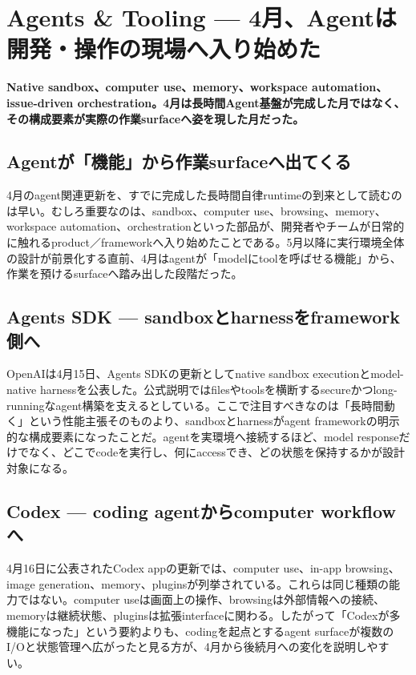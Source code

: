\section{Agents \& Tooling — 4月、Agentは開発・操作の現場へ入り始めた}
\label{pkg:agents-tooling-april}
\noindent\textbf{Native sandbox、computer use、memory、workspace automation、issue-driven orchestration。4月は長時間Agent基盤が完成した月ではなく、その構成要素が実際の作業surfaceへ姿を現した月だった。}\autocite{src-1ecdad90bfb4,src-20e34cbfb714,src-c71ef79e3212,src-f9ff221789e0}

\subsection{Agentが「機能」から作業surfaceへ出てくる}

4月のagent関連更新を、すでに完成した長時間自律runtimeの到来として読むのは早い。むしろ重要なのは、sandbox、computer use、browsing、memory、workspace automation、orchestrationといった部品が、開発者やチームが日常的に触れるproduct／frameworkへ入り始めたことである。5月以降に実行環境全体の設計が前景化する直前、4月はagentが「modelにtoolを呼ばせる機能」から、作業を預けるsurfaceへ踏み出した段階だった。\autocite{src-1ecdad90bfb4,src-20e34cbfb714,src-c71ef79e3212,src-f9ff221789e0}


\subsection{Agents SDK — sandboxとharnessをframework側へ}

OpenAIは4月15日、Agents SDKの更新としてnative sandbox executionとmodel-native harnessを公表した。公式説明ではfilesやtoolsを横断するsecureかつlong-runningなagent構築を支えるとしている。ここで注目すべきなのは「長時間動く」という性能主張そのものより、sandboxとharnessがagent frameworkの明示的な構成要素になったことだ。agentを実環境へ接続するほど、model responseだけでなく、どこでcodeを実行し、何にaccessでき、どの状態を保持するかが設計対象になる。\autocite{src-1ecdad90bfb4}


\subsection{Codex — coding agentからcomputer workflowへ}

4月16日に公表されたCodex appの更新では、computer use、in-app browsing、image generation、memory、pluginsが列挙されている。これらは同じ種類の能力ではない。computer useは画面上の操作、browsingは外部情報への接続、memoryは継続状態、pluginsは拡張interfaceに関わる。したがって「Codexが多機能になった」という要約よりも、codingを起点とするagent surfaceが複数のI/Oと状態管理へ広がったと見る方が、4月から後続月への変化を説明しやすい。\autocite{src-20e34cbfb714}


